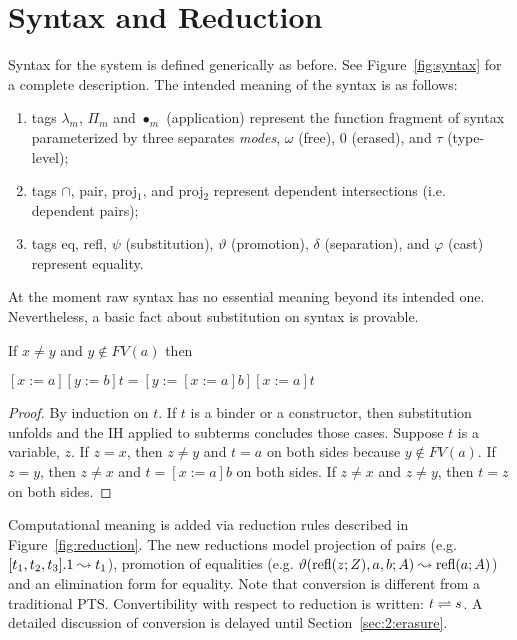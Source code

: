\section{Syntax and Reduction}




Syntax for the system is defined generically as before.
See Figure~\ref{fig:syntax} for a complete description.
The intended meaning of the syntax is as follows:
\begin{enumerate}
    \item tags $\lambda_m$, $\Pi_m$ and $\bullet_m$ (application) represent the function fragment of syntax parameterized by three separates \textit{modes}, $\omega$ (free), $0$ (erased), and $\tau$ (type-level);
    \item tags $\cap$, pair, proj$_1$, and proj$_2$ represent dependent intersections (i.e. dependent pairs);
    \item tags eq, refl, $\psi$ (substitution), $\vartheta$ (promotion), $\delta$ (separation), and $\varphi$ (cast) represent equality.
\end{enumerate}
At the moment raw syntax has no essential meaning beyond its intended one.
Nevertheless, a basic fact about substitution on syntax is provable.

\begin{lemma}
    If $x \neq y$ and $y \notin FV(a)$ then \begin{tightcenter} $[x := a][y := b]t = [y := [x := a]b][x := a]t$ \end{tightcenter}
    \label{lem:2:subst_commute}
\end{lemma}
\begin{proof}
    By induction on $t$.
    If $t$ is a binder or a constructor, then substitution unfolds and the IH applied to subterms concludes those cases.
    Suppose $t$ is a variable, $z$.
    If $z = x$, then $z \neq y$ and $t = a$ on both sides because $y \notin FV(a)$.
    If $z = y$, then $z \neq x$ and $t = [x := a]b$ on both sides.
    If $z \neq x$ and $z \neq y$, then $t = z$ on both sides.
\end{proof}

Computational meaning is added via reduction rules described in Figure~\ref{fig:reduction}.
The new reductions model projection of pairs (e.g. $[t_1, t_2, t_3].1 \leadsto t_1$), promotion of equalities (e.g. $\vartheta(\text{refl}(z; Z), a, b; A) \leadsto \text{refl}(a; A)$) and an elimination form for equality.
Note that conversion is different from a traditional PTS.
Convertibility with respect to reduction is written: $t \rightleftharpoons s$.
A detailed discussion of conversion is delayed until Section~\ref{sec:2:erasure}.

